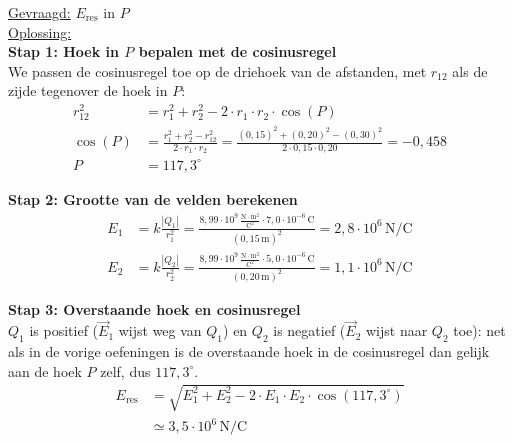 \documentclass{ximera}
\begin{document}
\begin{exercise}
\begin{solution}
        \underline{Gevraagd:} $E_{\text{res}}$ in $P$\\

        \underline{Oplossing:}\\
        \textbf{Stap 1: Hoek in $P$ bepalen met de cosinusregel}\\
        We passen de cosinusregel toe op de driehoek van de afstanden, met $r_{12}$ als de zijde tegenover de hoek in $P$:
        \begin{align*}
            r_{12}^{2} &= r_{1}^{2} + r_{2}^{2} - 2 \cdot r_{1} \cdot r_{2} \cdot \cos(P) \\
            \cos(P) &= \frac{r_{1}^{2} + r_{2}^{2} - r_{12}^{2}}{2 \cdot r_{1} \cdot r_{2}} = \frac{(0{,}15)^{2} + (0{,}20)^{2} - (0{,}30)^{2}}{2 \cdot 0{,}15 \cdot 0{,}20} = -0{,}458 \\
            P &= 117{,}3^\circ
        \end{align*}

        \textbf{Stap 2: Grootte van de velden berekenen}
        \begin{align*}
            E_{1} &= k \frac{|Q_{1}|}{r_{1}^{2}} = \frac{8{,}99 \cdot 10^{9} \, \mathrm{\frac{N \cdot m^2}{C^2}} \cdot 7{,}0 \cdot 10^{-6} \, \mathrm{C}}{(0{,}15 \, \mathrm{m})^{2}} = 2{,}8 \cdot 10^{6} \, \mathrm{N/C} \\
            E_{2} &= k \frac{|Q_{2}|}{r_{2}^{2}} = \frac{8{,}99 \cdot 10^{9} \, \mathrm{\frac{N \cdot m^2}{C^2}} \cdot 5{,}0 \cdot 10^{-6} \, \mathrm{C}}{(0{,}20 \, \mathrm{m})^{2}} = 1{,}1 \cdot 10^{6} \, \mathrm{N/C}
        \end{align*}

        \textbf{Stap 3: Overstaande hoek en cosinusregel}\\
        $Q_1$ is positief ($\vec{E}_1$ wijst weg van $Q_1$) en $Q_2$ is negatief ($\vec{E}_2$ wijst naar $Q_2$ toe): net als in de vorige oefeningen is de overstaande hoek in de cosinusregel dan gelijk aan de hoek $P$ zelf, dus $117{,}3^\circ$.
        \begin{align*}
            E_{\text{res}} &= \sqrt{E_1^{2} + E_2^{2} - 2 \cdot E_1 \cdot E_2 \cdot \cos(117{,}3^\circ)} \\
                            &\simeq \boxed{3{,}5 \cdot 10^{6} \, \mathrm{N/C}}
        \end{align*}
    \end{solution}
\end{exercise}
\end{document}

